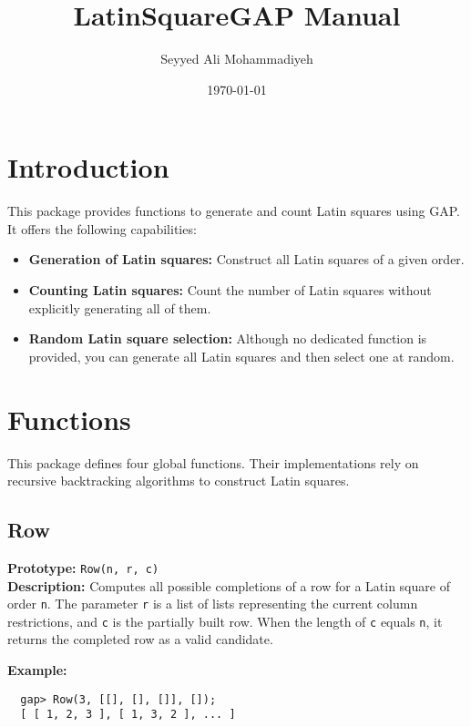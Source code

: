 \documentclass{report}
\title{LatinSquareGAP Manual}
\author{Seyyed Ali Mohammadiyeh}
\date{\today}
\begin{document}
\maketitle
\tableofcontents
\clearpage

\chapter{Introduction}
This package provides functions to generate and count Latin squares using GAP. It offers the following capabilities:
\begin{itemize}
  \item \textbf{Generation of Latin squares:} Construct all Latin squares of a given order.
  \item \textbf{Counting Latin squares:} Count the number of Latin squares without explicitly generating all of them.
  \item \textbf{Random Latin square selection:} Although no dedicated function is provided, you can generate all Latin squares and then select one at random.
\end{itemize}

\chapter{Functions}
This package defines four global functions. Their implementations rely on recursive backtracking algorithms to construct Latin squares.

\section{Row}
\textbf{Prototype:} \texttt{Row(n, r, c)}\\[1mm]
\textbf{Description:}  
Computes all possible completions of a row for a Latin square of order \texttt{n}. The parameter \texttt{r} is a list of lists representing the current column restrictions, and \texttt{c} is the partially built row. When the length of \texttt{c} equals \texttt{n}, it returns the completed row as a valid candidate. 

\textbf{Example:}
\begin{verbatim}
  gap> Row(3, [[], [], []], []);
  [ [ 1, 2, 3 ], [ 1, 3, 2 ], ... ]
\end{verbatim}
\end{document}
